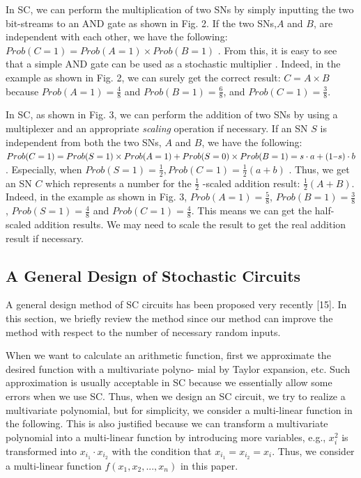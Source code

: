 \documentclass[10pt,conference]{IEEEtran}
\newcommand{\minus}{\scalebox{0.75}[1.0]{$-$}}
\begin{document}
In SC, we can perform the multiplication of two SNs by
simply inputting the two bit-streams to an AND gate as shown
in Fig. 2. If the two SNs,$A$ and $B$, are independent with each other, we have the following:
$Prob (C = 1) = Prob (A = 1) \times Prob (B = 1)$ . From this, it is easy to see that a simple
AND gate can be used as a
stochastic multiplier
. Indeed, in
the example as shown in Fig. 2, we can surely get the correct result:
$C = A \times B$ because  $Prob( A = 1) = \frac{4}{8}$ and $Prob( B = 1) = \frac{6}{8}$, and $Prob( C = 1) = \frac{3}{8}$.
\par
In SC, as shown in Fig. 3, we can perform the addition of two SNs by using a multiplexer and an appropriate \textit{scaling} operation if necessary. If an SN $S$ is independent from both the two SNs, $A$ and $B$, we have the following:
$Prob(C = 1) = Prob (S = 1) \times Prob(A = 1) + Prob(S = 0)\times Prob (B = 1) = s\cdot a + (1 \minus s)\cdot b$. Especially, when
$Prob(S = 1) = \frac{1}{2},Prob(C = 1) = \frac{1}{2} (a+b)$
. Thus, we get an SN
$C$ which represents a number for the $\frac{1}{2}$ -scaled addition result: $\frac{1}{2}(A+B)$. Indeed, in the example as shown in Fig. 3, $Prob(A = 1) = \frac{5}{8}$, $Prob(B = 1) = \frac{3}{8}$ , $Prob (S = 1) = \frac{4}{8}$ and $Prob(C =1) = \frac{4}{8}$. This means we can get the half-scaled addition results. We may need to scale the result to get the real addition result if necessary.

\subsection{A General Design of Stochastic Circuits}
A general design method of SC circuits has been proposed
very recently [15]. In this section, we briefly review the
method since our method can improve the method with respect
to the number of necessary random inputs.

\par
When we want to calculate an arithmetic function, first we
approximate the desired function with a multivariate polyno-
mial by Taylor expansion, etc. Such approximation is usually
acceptable in SC because we essentially allow some errors
when we use SC. Thus, when we design an SC circuit, we
try to realize a multivariate polynomial, but for simplicity, we
consider a multi-linear function in the following. This is also
justified because we can transform a multivariate polynomial
into a multi-linear function by introducing more variables, e.g.,
$x_i^{2}$ is transformed into $x_{i_1} \cdot x_{i_2}$ with the condition that $x_{i_1} = x_{i_2} = x_i$. Thus, we consider a multi-linear function $f(x_1,x_2,...,x_n)$ in this paper.
\end{document}
